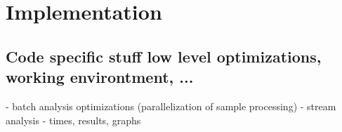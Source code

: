 \chapter{Implementation}
\minitoc

\section{Code specific stuff low level optimizations, working environtment, ...}
- batch analysis optimizations (parallelization of sample processing)
- stream analysis
- times, results, graphs